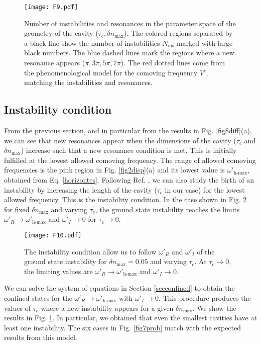 \documentclass[aps,pra,reprint,amsmath,amssymb,showpacs,groupedaddress,floatfix]{revtex4-1}
\begin{document}
\begin{figure}\centering
	\texttt{[image: F9.pdf]}
	\caption{Number of instabilities and resonances in the parameter space of the geometry of the cavity ($\tau_\text{c},\delta n_\text{max}$). The colored regions separated by a black line show the number of instabilities $N_\text{ins}$ marked with large black numbers. The blue dashed lines mark the regions where a new resonance appears ($\pi,3\pi,5\pi,7\pi$). The red dotted lines come from the phenomenological model for the comoving frequency $V'$, matching the instabilities and resonances.}
	\label{fig9num}
\end{figure}

\subsection{Instability condition}
From the previous section, and in particular from the results in Fig. \ref{fig8diff}(a), we can see that new resonances appear when the dimensions of the cavity ($\tau_c$ and $\delta n_\text{max}$) increase such that a new resonance condition is met. This is initially fulfilled at the lowest allowed comoving frequency. The range of allowed comoving frequencies is the pink region in Fig. \ref{fig2disp}(a) and its lowest value is $\omega'_\text{h-max}$, obtained from Eq. \eqref{horizontes}. Following Ref. \cite{michel2013saturation}, we can also study the birth of an instability by increasing the length of the cavity ($\tau_c$ in our case) for the lowest allowed frequency. This is the instability condition. In the case shown in Fig. \ref{fig10reim} for fixed $\delta n_\text{max}$ and varying $\tau_c$, the ground state instability reaches the limits $\omega'_R\rightarrow \omega'_\text{h-max}$ and $\omega'_I\rightarrow 0$ for $\tau_c\rightarrow 0$.

\begin{figure}\centering
	\texttt{[image: F10.pdf]}
	\caption{The instability condition allow us to follow $\omega'_R$ and $\omega'_I$ of the ground state instability for $\delta n_\text{max}=0.05$ and varying $\tau_c$. At $\tau_c\rightarrow 0$, the limiting values are $\omega'_R\rightarrow\omega'_\text{h-max}$ and $\omega'_I\rightarrow 0$.}
	\label{fig10reim}
\end{figure}

We can solve the system of equations in Section \ref{secconfined} to obtain the confined states for the $\omega'_R\rightarrow \omega'_\text{h-max}$ with $\omega'_I\rightarrow 0$. This procedure produces the values of $\tau_c$ where a new instability appears for a given $\delta n_\text{max}$. We show the results in Fig. \ref{fig9num}. In particular, we obtained that even the smallest cavities have at least one instability. The six cases in Fig. \ref{fig7prob} match with the expected results from this model.
\end{document}
